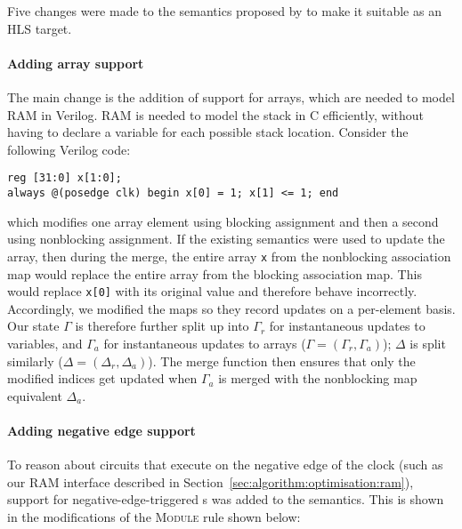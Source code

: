 Five changes were made to the semantics proposed by \textcite{loow19_proof_trans_veril_devel_hol} to make it suitable as an HLS target.

\paragraph{Adding array support}
The main change is the addition of support for arrays, which are needed to model RAM in Verilog.  RAM is needed to model the stack in C efficiently, without having to declare a variable for each possible stack location. %
Consider the following Verilog code:

\begin{center}
\begin{verbatim}
reg [31:0] x[1:0];
always @(posedge clk) begin x[0] = 1; x[1] <= 1; end
\end{verbatim}
\end{center}

which modifies one array element using blocking assignment and then a second using nonblocking assignment. If the existing semantics were used to update the array, then during the merge, the entire array \texttt{x} from the nonblocking association map would replace the entire array from the blocking association map.  This would replace \texttt{x[0]} with its original value and therefore behave incorrectly. Accordingly, we modified the maps so they record updates on a per-el\-em\-ent basis. Our state $\Gamma$ is therefore further split up into $\Gamma_{r}$ for instantaneous updates to variables, and $\Gamma_{a}$ for instantaneous updates to arrays ($\Gamma = (\Gamma_{r}, \Gamma_{a})$); $\Delta$ is split similarly ($\Delta = (\Delta_{r}, \Delta_{a})$). The merge function then ensures that only the modified indices get updated when $\Gamma_{a}$ is merged with the nonblocking map equivalent $\Delta_{a}$.

\paragraph{Adding negative edge support}
To reason about circuits that execute on the negative edge of the clock (such as our RAM interface described in Section~\ref{sec:algorithm:optimisation:ram}),  support for negative-edge-triggered \alwaysblock{}s was added to the semantics. This is shown in the modifications of the \textsc{Module} rule shown below:

